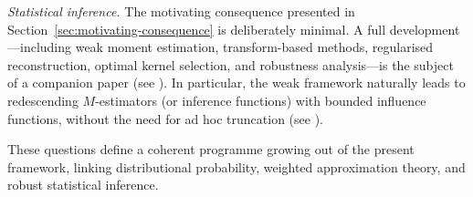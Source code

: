 \documentclass[12pt]{article}
\theoremstyle{definition}
\begin{document}
\medskip

\emph{Statistical inference.}
The motivating consequence presented in
Section~\ref{sec:motivating-consequence} is deliberately minimal. A full
development---including weak moment estimation, transform-based methods,
regularised reconstruction, optimal kernel selection, and robustness
analysis---is the subject of a companion paper (see \cite{LabouriauA2}). In particular, the weak
framework naturally leads to redescending $M$-estimators (or inference functions) with bounded
influence functions, without the need for ad hoc truncation (see  \cite{LabouriauPaperD}).

\medskip

These questions define a coherent programme growing out of the present
framework, linking distributional probability, weighted approximation
theory, and robust statistical inference.
\end{document}
